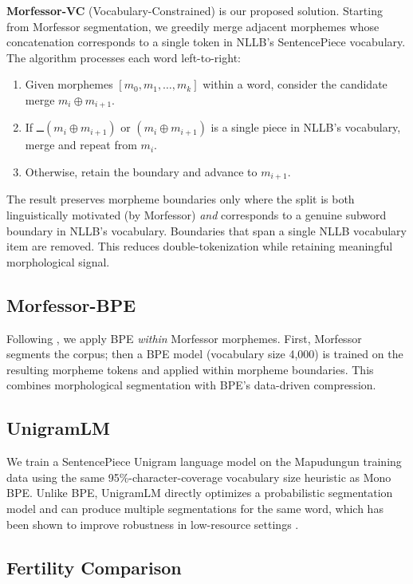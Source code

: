 \documentclass[11pt]{article}
\begin{document}
\textbf{Morfessor-VC} (Vocabulary-Constrained) is our proposed solution. Starting from Morfessor segmentation, we greedily merge adjacent morphemes whose concatenation corresponds to a single token in NLLB's SentencePiece vocabulary. The algorithm processes each word left-to-right:

\begin{enumerate}
  \item Given morphemes $[m_0, m_1, \ldots, m_k]$ within a word, consider the candidate merge $m_i \oplus m_{i+1}$.
  \item If $\text{▁}(m_i \oplus m_{i+1})$ or $(m_i \oplus m_{i+1})$ is a single piece in NLLB's vocabulary, merge and repeat from $m_i$.
  \item Otherwise, retain the boundary and advance to $m_{i+1}$.
\end{enumerate}

The result preserves morpheme boundaries only where the split is both linguistically motivated (by Morfessor) \textit{and} corresponds to a genuine subword boundary in NLLB's vocabulary. Boundaries that span a single NLLB vocabulary item are removed. This reduces double-tokenization while retaining meaningful morphological signal.

\subsection{Morfessor-BPE}

Following \citet{banerjee2018morpheme}, we apply BPE \textit{within} Morfessor morphemes. First, Morfessor segments the corpus; then a BPE model (vocabulary size 4,000) is trained on the resulting morpheme tokens and applied within morpheme boundaries. This combines morphological segmentation with BPE's data-driven compression.

\subsection{UnigramLM}

We train a SentencePiece Unigram language model \cite{kudo2018subword} on the Mapudungun training data using the same 95\%-character-coverage vocabulary size heuristic as Mono BPE. Unlike BPE, UnigramLM directly optimizes a probabilistic segmentation model and can produce multiple segmentations for the same word, which has been shown to improve robustness in low-resource settings \cite{kudo2018subword}.

\subsection{Fertility Comparison}
\end{document}
